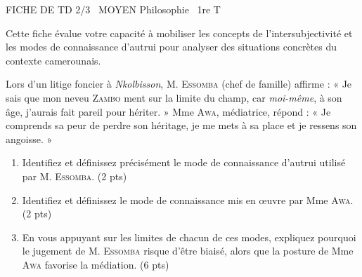 \documentclass[11pt]{article}
\begin{document}
\begin{tcolorbox}[enhanced,colback=popink,colframe=popink,arc=10pt,boxrule=0pt,left=12pt,right=12pt,top=9pt,bottom=9pt]
{\color{white}\popxbold\small FICHE DE TD 2/3 \textbullet\ MOYEN \hfill Philosophie \textbullet\ 1re T\par}
\end{tcolorbox}
\vspace{4pt}
Cette fiche évalue votre capacité à mobiliser les concepts de l'intersubjectivité et les modes de connaissance d'autrui pour analyser des situations concrètes du contexte camerounais.

\begin{exercice}
Lors d'un litige foncier à \textit{Nkolbisson}, M. \textsc{Essomba} (chef de famille) affirme : « Je sais que mon neveu \textsc{Zambo} ment sur la limite du champ, car \textit{moi-même}, à son âge, j'aurais fait pareil pour hériter. » Mme \textsc{Awa}, médiatrice, répond : « Je comprends sa peur de perdre son héritage, je me mets à sa place et je ressens son angoisse. »
\begin{enumerate}
    \item Identifiez et définissez précisément le mode de connaissance d'autrui utilisé par M. \textsc{Essomba}. (2 pts)
    \item Identifiez et définissez le mode de connaissance mis en œuvre par Mme \textsc{Awa}. (2 pts)
    \item En vous appuyant sur les limites de chacun de ces modes, expliquez pourquoi le jugement de M. \textsc{Essomba} risque d'être biaisé, alors que la posture de Mme \textsc{Awa} favorise la médiation. (6 pts)
\end{enumerate}
\end{exercice}
\end{document}
